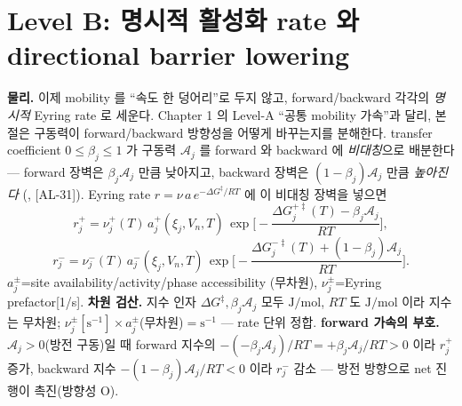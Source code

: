 \documentclass[11pt,a4paper]{article}
\newcommand{\AL}[1]{\textsf{[AL-#1]}}
\begin{document}
\section{Level B: 명시적 활성화 rate 와 directional barrier lowering}\label{sec:ch3_levelB}
\textbf{물리.} 이제 mobility 를 ``속도 한 덩어리''로 두지 않고, forward/backward 각각의 \emph{명시적} Eyring
rate 로 세운다. Chapter 1 의 Level-A ``공통 mobility 가속''과 달리, 본 절은 구동력이 forward/backward 방향성을
어떻게 바꾸는지를 분해한다. transfer coefficient
$0\le\beta_j\le1$ 가 구동력 $\mathcal A_j$ 를 forward 와 backward 에 \emph{비대칭}으로 배분한다 — forward 장벽은
$\beta_j\mathcal A_j$ 만큼 낮아지고, backward 장벽은 $(1-\beta_j)\mathcal A_j$ 만큼 \emph{높아진다}
(\cite{evanspolanyi1938,bardfaulkner,bazant2013}, \AL{31}). Eyring rate $r=\nu\,a\,e^{-\Delta G^\ddagger/RT}$ 에
이 비대칭 장벽을 넣으면
\begin{equation}
r_j^+=\nu_j^+(T)\,a_j^+(\xi_j,V_n,T)\,\exp\!\Big[-\frac{\Delta G_j^{+\ddagger}(T)-\beta_j\mathcal A_j}{RT}\Big],
\label{eq:ch3_rplus}
\end{equation}
\begin{equation}
r_j^-=\nu_j^-(T)\,a_j^-(\xi_j,V_n,T)\,\exp\!\Big[-\frac{\Delta G_j^{-\ddagger}(T)+(1-\beta_j)\mathcal A_j}{RT}\Big].
\label{eq:ch3_rminus}
\end{equation}
$a_j^\pm$=site availability/activity/phase accessibility (무차원), $\nu_j^\pm$=Eyring prefactor[1/s].
\textbf{차원 검산.} 지수 인자 $\Delta G^\ddagger,\beta_j\mathcal A_j$ 모두 $\mathrm{J/mol}$, $RT$ 도
$\mathrm{J/mol}$ 이라 지수는 무차원; $\nu_j^\pm[\mathrm{s^{-1}}]\times a_j^\pm$(무차원)$=\mathrm{s^{-1}}$ — rate
단위 정합. \textbf{forward 가속의 부호.} $\mathcal A_j>0$(방전 구동)일 때 forward 지수의 $-(-\beta_j\mathcal A_j)/RT
=+\beta_j\mathcal A_j/RT>0$ 이라 $r_j^+$ 증가, backward 지수 $-(1-\beta_j)\mathcal A_j/RT<0$ 이라 $r_j^-$ 감소 —
방전 방향으로 net 진행이 촉진(방향성 O).
\end{document}
